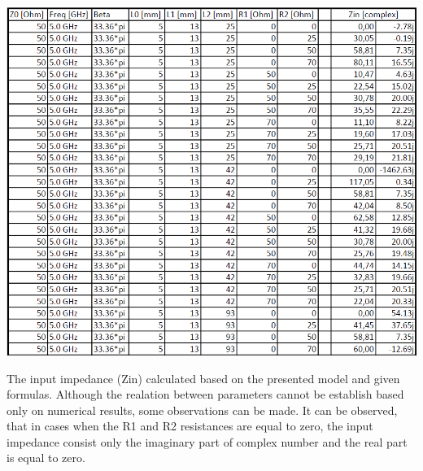 \documentclass[eng,printmode]{mgr}
\begin{document}
\begin{table}[h]
	\centering
	\includegraphics[width=0.7\linewidth]{microwave-fail1}
	\caption{The input impedance (Zin) calculated based on the presented model and given formulas. Although the realation between parameters cannot be establish based only on numerical results, some observations can be made. It can be observed, that in cases when the R1 and R2 resistances are equal to zero, the input impedance consist only the imaginary part of complex number and the real part is equal to zero.}
	\label{fig:microwave-fail1}
\end{table}
\newpage
\end{document}
